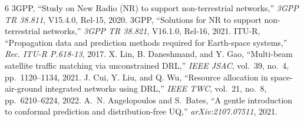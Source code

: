 \documentclass[9pt,a4paper]{article}
\begin{document}
\vspace{-2pt}
\begin{thebibliography}{6}
\footnotesize
\setlength{\itemsep}{0.2pt}
\setlength{\parskip}{0pt}
 3GPP, ``Study on New Radio (NR) to support non-terrestrial networks,'' \textit{3GPP TR 38.811}, V15.4.0, Rel-15, 2020.
 3GPP, ``Solutions for NR to support non-terrestrial networks,'' \textit{3GPP TR 38.821}, V16.1.0, Rel-16, 2021.
 ITU-R, ``Propagation data and prediction methods required for Earth-space systems,'' \textit{Rec. ITU-R P.618-13}, 2017.
 X. Lin, B. Daneshmand, and Y. Gao, ``Multi-beam satellite traffic matching via unconstrained DRL,'' \textit{IEEE JSAC}, vol.~39, no.~4, pp.~1120--1134, 2021.
 J. Cui, Y. Liu, and Q. Wu, ``Resource allocation in space-air-ground integrated networks using DRL,'' \textit{IEEE TWC}, vol.~21, no.~8, pp.~6210--6224, 2022.
 A.~N. Angelopoulos and S.~Bates, ``A gentle introduction to conformal prediction and distribution-free UQ,'' \textit{arXiv:2107.07511}, 2021.
\end{thebibliography}
\end{document}
